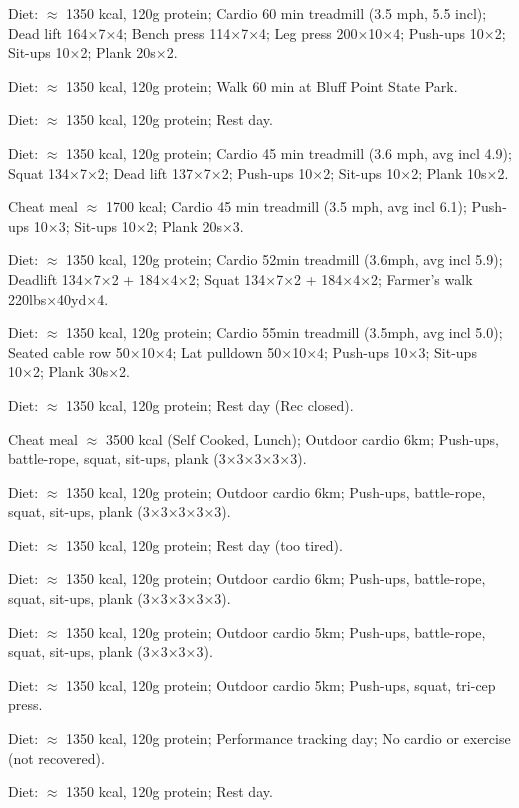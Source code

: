 \item [Aug 31] Diet: $\approx$ 1350 kcal, 120g protein; Cardio 60 min treadmill (3.5 mph, 5.5 incl); Dead lift 164×7×4; Bench press 114×7×4; Leg press 200×10×4; Push-ups 10×2; Sit-ups 10×2; Plank 20s×2.
\item [Aug 30] Diet: $\approx$ 1350 kcal, 120g protein; Walk 60 min at Bluff Point State Park.
\item [Aug 29] Diet: $\approx$ 1350 kcal, 120g protein; Rest day.
\item [Aug 28] Diet: $\approx$ 1350 kcal, 120g protein; Cardio 45 min treadmill (3.6 mph, avg incl 4.9); Squat 134×7×2; Dead lift 137×7×2; Push-ups 10×2; Sit-ups 10×2; Plank 10s×2.
\item [Aug 27] Cheat meal $\approx$ 1700 kcal; Cardio 45 min treadmill (3.5 mph, avg incl 6.1); Push-ups 10×3; Sit-ups 10×2; Plank 20s×3.
\item [Aug 26] Diet: $\approx$ 1350 kcal, 120g protein; Cardio 52min treadmill (3.6mph, avg incl 5.9); Deadlift 134×7×2 + 184×4×2; Squat 134×7×2 + 184×4×2; Farmer’s walk 220lbs×40yd×4.
\item [Aug 25] Diet: $\approx$ 1350 kcal, 120g protein; Cardio 55min treadmill (3.5mph, avg incl 5.0); Seated cable row 50×10×4; Lat pulldown 50×10×4; Push-ups 10×3; Sit-ups 10×2; Plank 30s×2.
\item [Aug 24] Diet: $\approx$ 1350 kcal, 120g protein; Rest day (Rec closed).
\item [Aug 23] Cheat meal $\approx$ 3500 kcal (Self Cooked, Lunch); Outdoor cardio 6km; Push-ups, battle-rope, squat, sit-ups, plank (3×3×3×3×3).
\item [Aug 22] Diet: $\approx$ 1350 kcal, 120g protein; Outdoor cardio 6km; Push-ups, battle-rope, squat, sit-ups, plank (3×3×3×3×3).
\item [Aug 21] Diet: $\approx$ 1350 kcal, 120g protein; Rest day (too tired). 
\item [Aug 20] Diet: $\approx$ 1350 kcal, 120g protein; Outdoor cardio 6km; Push-ups, battle-rope, squat, sit-ups, plank (3×3×3×3×3).
\item [Aug 19] Diet: $\approx$ 1350 kcal, 120g protein; Outdoor cardio 5km; Push-ups, battle-rope, squat, sit-ups, plank (3×3×3×3).
\item [Aug 18] Diet: $\approx$ 1350 kcal, 120g protein; Outdoor cardio 5km; Push-ups, squat, tri-cep press.
\item [Aug 17] Diet: $\approx$ 1350 kcal, 120g protein; Performance tracking day; No cardio or exercise (not recovered).
\item [Aug 16] Diet: $\approx$ 1350 kcal, 120g protein; Rest day.
